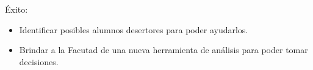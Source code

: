 
Éxito:
\begin{itemize}
\item Identificar posibles alumnos desertores para poder ayudarlos.
\item Brindar a la Facutad de una nueva herramienta de análisis para poder tomar decisiones.
\end{itemize}
